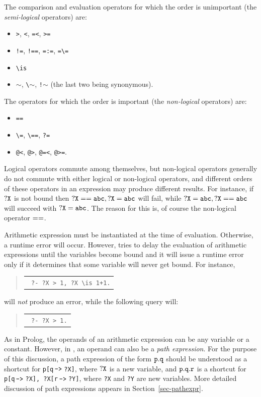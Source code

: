 \documentclass[11pt]{article}
\newcommand{\ERGO}{\mbox{\smaller{\ensuremath{\cal{E}}\smaller{{\sc{RGO}}}}}\xspace}
\newcommand{\FLSYSTEM}{\ERGO}
\newenvironment{qrules}{\begin{quote}\tt\begin{tabular}[t]{l}}%
{\end{tabular}\end{quote}}
\newcommand{\mvd}{{\mbox{\tt \,->\,}}}  %
\newcommand{\bs}{\textbackslash}
\begin{document}
The comparison and evaluation operators for which the order is unimportant
(the \emph{semi-logical} operators)  are:
\begin{itemize}
\item  \texttt{>}, \texttt{<}, \texttt{=<}, \texttt{>=}
\item  \texttt{!=}, \texttt{!==}, \texttt{=:=}, \texttt{=\bs=}
\item \texttt{\bs{}is}
\item \texttt{$\sim$}, \texttt{\bs$\sim$}, \texttt{!$\sim$} (the last
  two being synonymous).
\end{itemize}
The operators for which the order is important (the \emph{non-logical}
operators) are:
\begin{itemize}
\item  \texttt{==}
\item  \texttt{\bs=}, \texttt{\bs==}, \texttt{?=}
\item  \texttt{@<}, \texttt{@>}, \texttt{@=<}, \texttt{@>=}.  
\end{itemize}
Logical operators commute among themselves, but non-logical operators
generally do not commute with either logical or non-logical operators, and
different orders of these operators in an expression  may produce different
results. For instance, if $\tt ?X$ is not bound then $\tt ?X == abc, ?X=abc$ will
fail, while  $\tt ?X=abc, ?X == abc$ will succeed with $\tt ?X = abc$.
The reason for this is, of course the non-logical operator $\tt ==$.

Arithmetic expression must be instantiated at the time of
evaluation. Otherwise, a runtime error will occur.
However, \FLSYSTEM tries to delay the evaluation of arithmetic expressions
until the variables become bound and it will issue a runtime error only if
it determines that some variable will never get bound.
For instance,
\begin{qrules}
  \tt
?- ?X > 1, ?X \bs{}is 1+1.
\end{qrules}
will \emph{not}  produce an error, while the following query will:
\begin{qrules}
  \tt
?-  ?X > 1.
\end{qrules}

As in Prolog, the operands of an arithmetic expression can be any variable
or a constant. However, in \FLSYSTEM, an operand can also be a \emph{path
  expression}. For the purpose of this discussion, a path expression of the
form $\tt p.q$ should be understood as a shortcut for {\tt p[q$\mvd$?X]}, where
$\tt ?X$ is a new variable, and $\tt p.q.r$ is a shortcut for {\tt p[q$\mvd$?X],
  ?X[r$\mvd$?Y]}, where \texttt{?X} and \texttt{?Y} are new variables.
More detailed discussion
of path expressions appears in Section~\ref{sec-pathexpr}.
\end{document}
